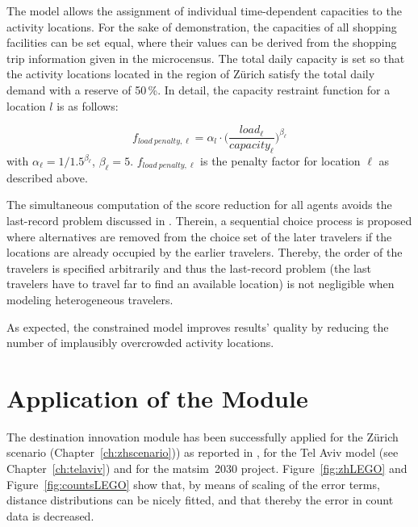 The model allows the assignment of individual time-dependent capacities to the activity locations. For the sake of demonstration, the capacities of all shopping facilities can be set equal, where their values can be derived from the shopping trip information given in the \gls{microcensus}.
The total daily capacity is set so that the activity locations located in the region of Zürich satisfy the total daily demand with a reserve of 50\,\%. In detail, the capacity restraint function for a location $l$ is as follows:

\[
f_{load\ penalty, \ell}=\alpha_l \cdot \Bigg(\frac{load_{\ell}}{capacity_{\ell}}\Bigg)^{\beta_\ell}
\]
with $\alpha_\ell=1/1.5^{\beta_\ell}$, $\beta_\ell=5$. $f_{load\ penalty, \ell}$ is the penalty factor for location $\ell$ as described above.

The simultaneous computation of the score reduction for all agents avoids the last-record problem discussed in \citet[][]{VovshaEtAl_TRR_2002}. 
Therein, a sequential choice process is proposed where alternatives are removed from the choice set of the later travelers if the locations are already occupied by the earlier travelers. 
Thereby, the order of the travelers is specified arbitrarily and thus the last-record problem (the last travelers have to travel far to find an available location) is not negligible when modeling heterogeneous travelers. 

As expected, the constrained model improves results' quality by reducing the number of implausibly overcrowded activity locations.

\section{Application of the Module}
The destination innovation module has been successfully applied for the Zürich scenario (Chapter~\ref{ch:zhscenario})) as reported in \citet[][p.99]{Horni_PhDThesis_2013}, for the Tel Aviv model (see Chapter~\ref{ch:telaviv}) and for the \gls{matsim}~2030 project. 
Figure~\ref{fig:zhLEGO} and Figure~\ref{fig:countsLEGO} show that, by means of scaling of the error terms, distance distributions can be nicely fitted, and that thereby the error in count data is decreased.

